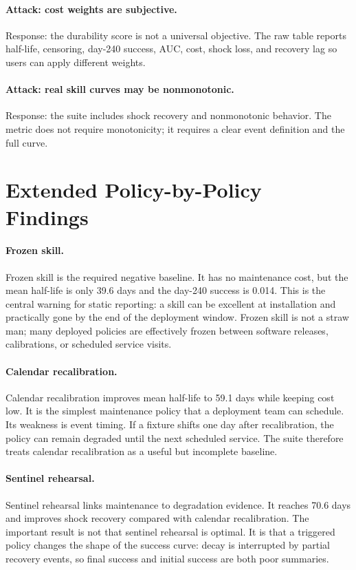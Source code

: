 \documentclass{article}
\begin{document}
\paragraph{Attack: cost weights are subjective.}
Response: the durability score is not a universal objective. The raw table
reports half-life, censoring, day-240 success, AUC, cost, shock loss, and
recovery lag so users can apply different weights.

\paragraph{Attack: real skill curves may be nonmonotonic.}
Response: the suite includes shock recovery and nonmonotonic behavior. The
metric does not require monotonicity; it requires a clear event definition and
the full curve.

\section{Extended Policy-by-Policy Findings}

\paragraph{Frozen skill.}
Frozen skill is the required negative baseline. It has no maintenance cost, but
the mean half-life is only 39.6 days and the day-240 success is 0.014. This is
the central warning for static reporting: a skill can be excellent at
installation and practically gone by the end of the deployment window. Frozen
skill is not a straw man; many deployed policies are effectively frozen between
software releases, calibrations, or scheduled service visits.

\paragraph{Calendar recalibration.}
Calendar recalibration improves mean half-life to 59.1 days while keeping cost
low. It is the simplest maintenance policy that a deployment team can schedule.
Its weakness is event timing. If a fixture shifts one day after recalibration,
the policy can remain degraded until the next scheduled service. The suite
therefore treats calendar recalibration as a useful but incomplete baseline.

\paragraph{Sentinel rehearsal.}
Sentinel rehearsal links maintenance to degradation evidence. It reaches 70.6
days and improves shock recovery compared with calendar recalibration. The
important result is not that sentinel rehearsal is optimal. It is that a
triggered policy changes the shape of the success curve: decay is interrupted
by partial recovery events, so final success and initial success are both poor
summaries.
\end{document}
